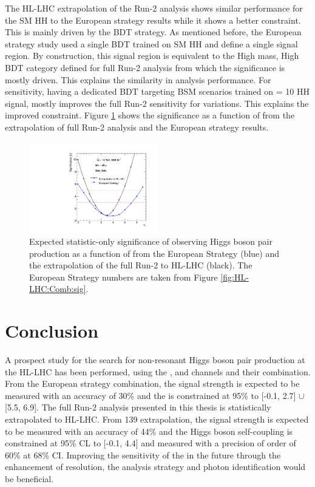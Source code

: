 The HL-LHC extrapolation of the Run-2 analysis shows similar performance for the SM HH to the European strategy results while it shows a better \kl constraint. This is mainly driven by the BDT strategy. As mentioned before, the European strategy study used a single BDT trained on SM HH and define a single signal region. By construction, this signal region is equivalent to the High mass, High BDT category defined for full Run-2 analysis from which the significance is mostly driven. This explains the similarity in analysis performance. For \kl sensitivity, having a dedicated BDT targeting BSM scenarios trained on \kl = 10 HH signal, mostly improves the full Run-2 sensitivity for \kl variations. This explains the improved \kl constraint. Figure \ref{fig:HL-LHC:Sig} shows the significance as a function of \kl from the extrapolation of full Run-2 analysis and the European strategy results.
\begin{figure}[htbp]
    \centering
    \includegraphics[width=0.5\textwidth]{Ch6/Img/sig.pdf}
    \begin{tcolorbox}[colback=black!5!white, colframe=white!75!black]
    \caption{Expected statistic-only significance of observing Higgs boson pair production as a function of \kl from the European Strategy \bbyy (blue) and the extrapolation of the full Run-2 \bbyy to HL-LHC (black). The European Strategy numbers are taken from Figure \ref{fig:HL-LHC:Comb:sig}.}
    \label{fig:HL-LHC:Sig}
    \end{tcolorbox}
\end{figure}

\section{Conclusion}
A prospect study for the search for non-resonant Higgs boson pair production at the HL-LHC has been performed, using the \bbbb, \bbyy and \bbtt channels and their combination. From the European strategy combination, the signal strength is expected to be measured with an accuracy of 30\% and the \kl is constrained at 95\% to [-0.1, 2.7] $\cup$ [5.5, 6.9]. The full Run-2 \HHyybb analysis presented in this thesis is statistically extrapolated to HL-LHC. From 139 \ifb \HHyybb extrapolation, the signal strength is expected to be measured with an accuracy of 44\% and the Higgs boson self-coupling is constrained at 95\% CL to [-0.1, 4.4] and measured with a precision of order of 60\% at 68\% CI. Improving the sensitivity of the \HHyybb in the future through the enhancement of \mbb resolution, the analysis strategy and photon identification would be beneficial.  

